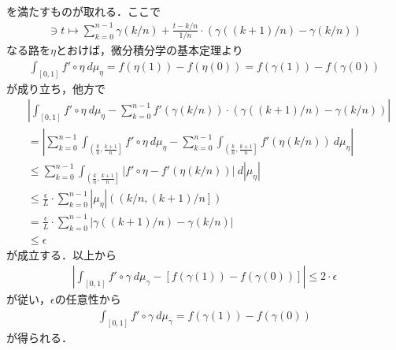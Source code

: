 \begin{sketch}
		を満たすものが取れる．ここで
		\begin{align}
			[0,1] \ni t \longmapsto \sum_{k=0}^{n-1} \gamma(k/n) + \frac{t - k/n}{1/n} \cdot \left(\gamma((k+1)/n) - \gamma(k/n)\right)
		\end{align}
		なる路を$\eta$とおけば，微分積分学の基本定理より
		\begin{align}
			\int_{[0,1]} f' \circ \eta\ d\mu_{\eta} = f(\eta(1)) - f(\eta(0))
			= f(\gamma(1)) - f(\gamma(0))
		\end{align}
		が成り立ち，他方で
		\begin{align}
			&\left|\int_{[0,1]} f' \circ \eta\ d\mu_{\eta}
			- \sum_{k=0}^{n-1} f'(\gamma(k/n)) \cdot \left(\gamma((k+1)/n) - \gamma(k/n)\right)\right| \\
			&= \left|\sum_{k=0}^{n-1} \int_{\left(\frac{k}{n},\frac{k+1}{n}\right]} f' \circ \eta\ d\mu_{\eta}
			- \sum_{k=0}^{n-1} \int_{\left(\frac{k}{n},\frac{k+1}{n}\right]} f'(\eta(k/n))\ d\mu_{\eta}\right| \\
			&\leq \sum_{k=0}^{n-1} \int_{\left(\frac{k}{n},\frac{k+1}{n}\right]}
			\left|f' \circ \eta - f'(\eta(k/n))\right|\ d|\mu_{\eta}| \\
			&\leq \frac{\epsilon}{L} \cdot \sum_{k=0}^{n-1} |\mu_{\eta}|\left(\left(k/n,(k+1)/n\right]\right) \\
			&= \frac{\epsilon}{L} \cdot \sum_{k=0}^{n-1} \left|\gamma((k+1)/n) - \gamma(k/n)\right| \\
			&\leq \epsilon
		\end{align}
		が成立する．以上から
		\begin{align}
			\left|\int_{[0,1]} f'\circ\gamma\ d\mu_{\gamma}
			- \left[f(\gamma(1)) - f(\gamma(0))\right]\right|
			\leq 2 \cdot \epsilon
		\end{align}
		が従い，$\epsilon$の任意性から
		\begin{align}
			\int_{[0,1]} f'\circ\gamma\ d\mu_{\gamma} = f(\gamma(1)) - f(\gamma(0))
		\end{align}
		が得られる．
		\QED
	\end{sketch}
	
